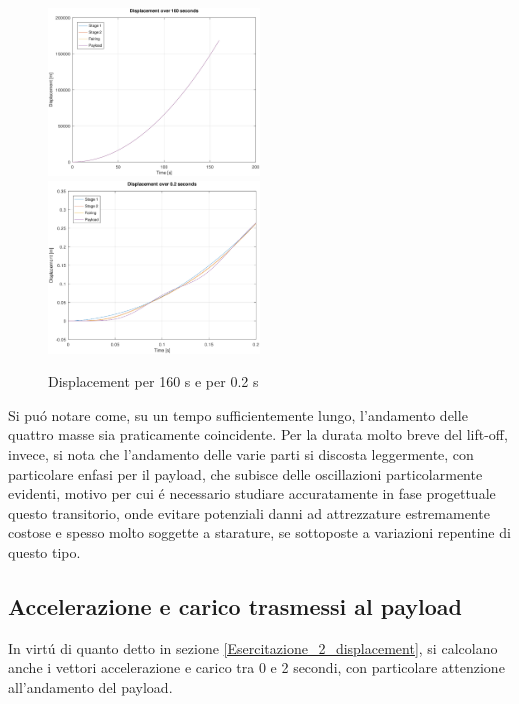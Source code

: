 \documentclass{article}
\begin{document}
            \begin{figure}[h!]
                 \label{fig:displacement_x}
                \includegraphics[width=0.5\textwidth]{MUL2/Esercitazione2/Matlab/disp_160.eps}
                \includegraphics[width=0.5\textwidth]{MUL2/Esercitazione2/Matlab/disp_0.2.eps}
                \caption{Displacement per 160 s e per 0.2 s}
            \end{figure}
        
        Si puó notare come, su un tempo sufficientemente lungo, l'andamento delle quattro masse sia praticamente coincidente.
        Per la durata molto breve del lift-off, invece, si nota che l'andamento delle varie parti 
        si discosta leggermente, con particolare enfasi per il payload, che subisce delle oscillazioni particolarmente
        evidenti, motivo per cui é necessario studiare accuratamente in fase progettuale questo transitorio, 
        onde evitare potenziali danni ad attrezzature estremamente costose e spesso molto soggette a starature, se sottoposte a variazioni
        repentine di questo tipo.

        \clearpage

        \subsection{Accelerazione e carico trasmessi al payload\label{Esercitazione_2_acc_load}}

        In virtú di quanto detto in sezione \ref{Esercitazione_2_displacement}, si calcolano anche i 
        vettori accelerazione e carico tra 0 e 2 secondi, con particolare attenzione all'andamento del payload.
\end{document}
